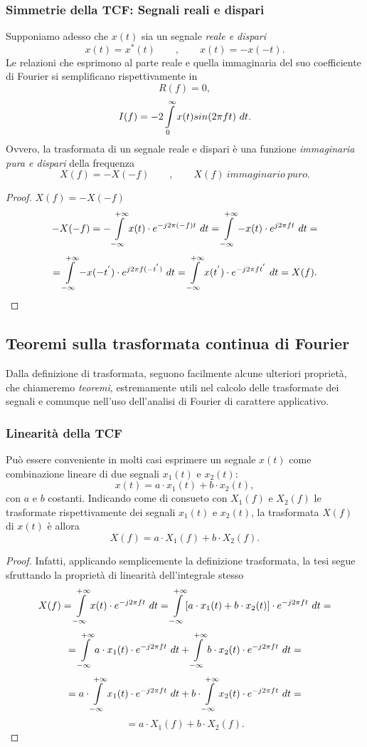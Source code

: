 \documentclass[12pt,oneside,openany]{memoir}
\numberwithin{equation}{subsection}
\newcommand{\dt}{\ dt}
\begin{document}
\subsubsection{Simmetrie della TCF: Segnali reali e dispari}
Supponiamo adesso che $x(t)$ sia un segnale \textit{reale e dispari}
\[
	x(t) = x^*(t) \quad\quad , \quad\quad x(t) = -x(-t).
\]
Le relazioni che esprimono al parte reale e quella immaginaria del suo coefficiente di Fourier si semplificano rispettivamente in
\[
	R(f) = 0,
\]
\[
	I(f) = -2 \int\displaylimits_{0}^{\infty} x(t) sin(2 \pi f t) \dt.
\]
Ovvero, la trasformata di un segnale reale e dispari \`e una funzione \textit{immaginaria pura e dispari} della frequenza
\[
	X(f) = -X(-f) \quad\quad , \quad\quad X(f) \ immaginario \ puro.
\]
\begin{proof}
$X(f) = -X(-f)$
\[
	-X(-f) = -\int\displaylimits_{-\infty}^{+\infty} x(t) \cdot e^{-j 2 \pi (-f) t} \dt = \int\displaylimits_{-\infty}^{+\infty} -x(t) \cdot e^{j 2 \pi f t} \dt =
\]
\[
	= \int\displaylimits_{-\infty}^{+\infty} -x(-t^{'}) \cdot e^{j 2 \pi f (-t^{'})} \dt = \int\displaylimits_{-\infty}^{+\infty} x(t^{'}) \cdot e^{-j 2 \pi f t^{'}} \dt = X(f).
\]
\end{proof}

\newpage
\subsection{Teoremi sulla trasformata continua di Fourier}
Dalla definizione di trasformata, seguono facilmente alcune ulteriori propriet\`a, che chiameremo \textit{teoremi}, estremamente utili nel calcolo delle trasformate dei segnali e comunque nell'uso dell'analisi di Fourier di carattere applicativo.

\subsubsection{Linearit\`a della TCF}
Pu\`o essere conveniente in molti casi esprimere un segnale $x(t)$ come combinazione lineare di due segnali $x_1(t)$ e $x_2(t)$:
\[
	x(t) = a \cdot x_1(t) + b \cdot x_2(t),
\]
con $a$ e $b$ costanti. Indicando come di consueto con $X_1(f)$ e $X_2(f)$ le trasformate rispettivamente dei segnali $x_1(t)$ e $x_2(t)$, la trasformata $X(f)$ di $x(t)$ \`e allora
\[
	X(f) = a \cdot X_1(f) + b \cdot X_2(f).
\]
\begin{proof}
Infatti, applicando semplicemente la definizione trasformata, la tesi segue sfruttando la propriet\`a di linearit\`a dell'integrale stesso
\[
	X(f) = \int\displaylimits_{-\infty}^{+\infty} x(t) \cdot e^{-j 2 \pi f t} \dt = \int\displaylimits_{-\infty}^{+\infty} [a \cdot x_1(t) + b \cdot x_2(t)] \cdot e^{-j 2 \pi f t} \dt =
\]
\[
	= \int\displaylimits_{-\infty}^{+\infty} a \cdot x_1(t) \cdot e^{-j 2 \pi f t} \dt + \int\displaylimits_{-\infty}^{+\infty} b \cdot x_2(t) \cdot e^{-j 2 \pi f t} \dt =
\]
\[
	= a \cdot \int\displaylimits_{-\infty}^{+\infty} x_1(t) \cdot e^{-j 2 \pi f t} \dt + b \cdot \int\displaylimits_{-\infty}^{+\infty} x_2(t) \cdot e^{-j 2 \pi f t} \dt =
\]
\[
	= a \cdot X_1(f) + b \cdot X_2(f).
\]
\end{proof}
\end{document}
